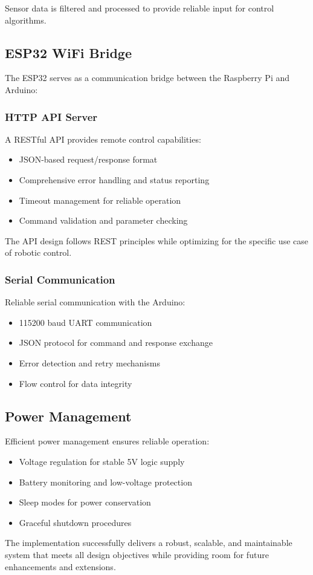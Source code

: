 Sensor data is filtered and processed to provide reliable input for control algorithms.

\subsection{ESP32 WiFi Bridge}

The ESP32 serves as a communication bridge between the Raspberry Pi and Arduino:

\subsubsection{HTTP API Server}

A RESTful API provides remote control capabilities:

\begin{itemize}
    \item JSON-based request/response format
    \item Comprehensive error handling and status reporting
    \item Timeout management for reliable operation
    \item Command validation and parameter checking
\end{itemize}

The API design follows REST principles while optimizing for the specific use case of robotic control.

\subsubsection{Serial Communication}

Reliable serial communication with the Arduino:

\begin{itemize}
    \item 115200 baud UART communication
    \item JSON protocol for command and response exchange
    \item Error detection and retry mechanisms
    \item Flow control for data integrity
\end{itemize}

\subsection{Power Management}

Efficient power management ensures reliable operation:

\begin{itemize}
    \item Voltage regulation for stable 5V logic supply
    \item Battery monitoring and low-voltage protection
    \item Sleep modes for power conservation
    \item Graceful shutdown procedures
\end{itemize}
The implementation successfully delivers a robust, scalable, and maintainable system that meets all design objectives while providing room for future enhancements and extensions.